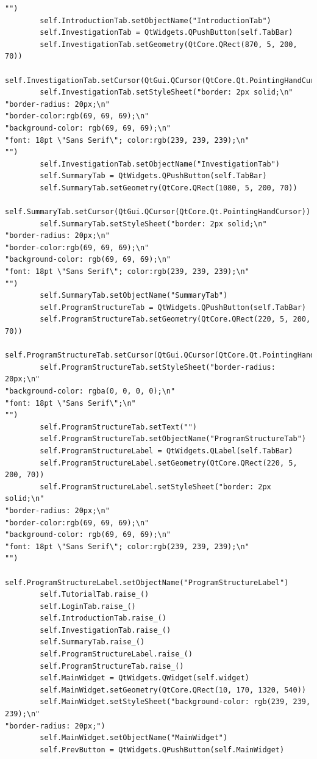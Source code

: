 \documentclass[12pt]{article}
\begin{document}
\begin{lstlisting}
"")
        self.IntroductionTab.setObjectName("IntroductionTab")
        self.InvestigationTab = QtWidgets.QPushButton(self.TabBar)
        self.InvestigationTab.setGeometry(QtCore.QRect(870, 5, 200, 70))
        self.InvestigationTab.setCursor(QtGui.QCursor(QtCore.Qt.PointingHandCursor))
        self.InvestigationTab.setStyleSheet("border: 2px solid;\n"
"border-radius: 20px;\n"
"border-color:rgb(69, 69, 69);\n"
"background-color: rgb(69, 69, 69);\n"
"font: 18pt \"Sans Serif\"; color:rgb(239, 239, 239);\n"
"")
        self.InvestigationTab.setObjectName("InvestigationTab")
        self.SummaryTab = QtWidgets.QPushButton(self.TabBar)
        self.SummaryTab.setGeometry(QtCore.QRect(1080, 5, 200, 70))
        self.SummaryTab.setCursor(QtGui.QCursor(QtCore.Qt.PointingHandCursor))
        self.SummaryTab.setStyleSheet("border: 2px solid;\n"
"border-radius: 20px;\n"
"border-color:rgb(69, 69, 69);\n"
"background-color: rgb(69, 69, 69);\n"
"font: 18pt \"Sans Serif\"; color:rgb(239, 239, 239);\n"
"")
        self.SummaryTab.setObjectName("SummaryTab")
        self.ProgramStructureTab = QtWidgets.QPushButton(self.TabBar)
        self.ProgramStructureTab.setGeometry(QtCore.QRect(220, 5, 200, 70))
        self.ProgramStructureTab.setCursor(QtGui.QCursor(QtCore.Qt.PointingHandCursor))
        self.ProgramStructureTab.setStyleSheet("border-radius: 20px;\n"
"background-color: rgba(0, 0, 0, 0);\n"
"font: 18pt \"Sans Serif\";\n"
"")
        self.ProgramStructureTab.setText("")
        self.ProgramStructureTab.setObjectName("ProgramStructureTab")
        self.ProgramStructureLabel = QtWidgets.QLabel(self.TabBar)
        self.ProgramStructureLabel.setGeometry(QtCore.QRect(220, 5, 200, 70))
        self.ProgramStructureLabel.setStyleSheet("border: 2px solid;\n"
"border-radius: 20px;\n"
"border-color:rgb(69, 69, 69);\n"
"background-color: rgb(69, 69, 69);\n"
"font: 18pt \"Sans Serif\"; color:rgb(239, 239, 239);\n"
"")
        self.ProgramStructureLabel.setObjectName("ProgramStructureLabel")
        self.TutorialTab.raise_()
        self.LoginTab.raise_()
        self.IntroductionTab.raise_()
        self.InvestigationTab.raise_()
        self.SummaryTab.raise_()
        self.ProgramStructureLabel.raise_()
        self.ProgramStructureTab.raise_()
        self.MainWidget = QtWidgets.QWidget(self.widget)
        self.MainWidget.setGeometry(QtCore.QRect(10, 170, 1320, 540))
        self.MainWidget.setStyleSheet("background-color: rgb(239, 239, 239);\n"
"border-radius: 20px;")
        self.MainWidget.setObjectName("MainWidget")
        self.PrevButton = QtWidgets.QPushButton(self.MainWidget)

\end{lstlisting}
\end{document}
